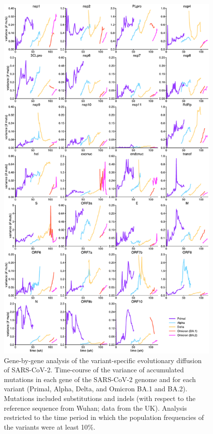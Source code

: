 \begin{figure}[ht!]
    \centering
    \includegraphics[width=0.7375\linewidth]{assets/Ch4Fig5.pdf}
    \caption{Gene-by-gene analysis of the variant-specific evolutionary diffusion of SARS-CoV-2. Time-course of the variance of accumulated mutations in each gene of the SARS-CoV-2 genome and for each variant (Primal, Alpha, Delta, and Omicron BA.1 and BA.2). Mutations included substitutions and indels (with respect to the reference sequence from Wuhan; data from the UK). Analysis restricted to the time period in which the population frequencies of the variants were at least 10\%.}\label{fig:fig4.5}
\end{figure}

\vfill
\pagebreak

